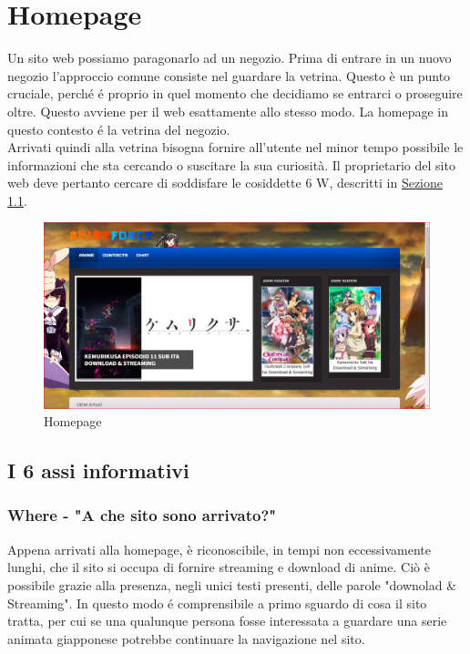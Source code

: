 \section{Homepage} \label{Homepage}
Un sito web possiamo paragonarlo ad un negozio. Prima di entrare in un nuovo negozio l’approccio comune consiste nel guardare la vetrina. Questo è un punto cruciale, perché é proprio in quel momento che decidiamo se entrarci o proseguire oltre. Questo avviene per il web esattamente allo stesso modo. La homepage in questo contesto é la vetrina del negozio. \\
Arrivati quindi alla vetrina bisogna fornire all'utente nel minor tempo possibile le informazioni che sta cercando o  suscitare la sua curiosità. Il proprietario del sito web deve pertanto cercare di soddisfare le cosiddette 6 W, descritti in \hyperref[Assi informativi]{Sezione \ref{Assi informativi}}. 

\begin{figure}[H]
	\centering 
	\includegraphics[width=1\textwidth]{img/hp01.png}
	\caption{Homepage} 
	\label{img1} 
\end{figure}

\subsection{I 6 assi informativi} \label{Assi informativi}

\subsubsection{Where - "A che sito sono arrivato?"} \label{HWhere}
Appena arrivati alla homepage, è riconoscibile,  in tempi non eccessivamente lunghi, che il sito si occupa di fornire streaming e download di anime. Ciò è possibile grazie alla presenza, negli unici testi presenti, delle parole "downolad \& Streaming". In questo modo é comprensibile a primo sguardo di cosa il sito tratta, per cui se una qualunque persona fosse interessata a guardare una serie animata giapponese potrebbe continuare la navigazione nel sito.

